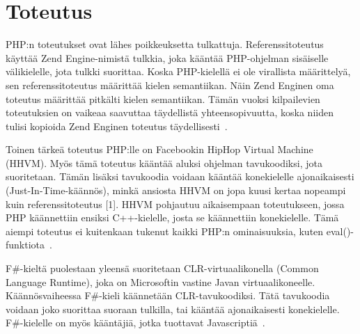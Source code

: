 \section{Toteutus}
PHP:n toteutukset ovat lähes poikkeuksetta tulkattuja. Referenssitoteutus  käyttää Zend Engine-nimistä tulkkia, joka kääntää PHP-ohjelman sisäiselle välikielelle, jota tulkki suorittaa. Koska PHP-kielellä ei ole virallista määrittelyä, sen referenssitoteutus määrittää kielen semantiikan. Näin Zend Enginen oma toteutus määrittää pitkälti kielen semantiikan. Tämän vuoksi kilpailevien toteutuksien on vaikeaa saavuttaa täydellistä yhteensopivuutta, koska niiden tulisi kopioida Zend Enginen toteutus täydellisesti~\cite{wiki_php}.

Toinen tärkeä toteutus PHP:lle on Facebookin HipHop Virtual Machine (HHVM).  Myös tämä toteutus kääntää aluksi ohjelman tavukoodiksi, jota suoritetaan. Tämän lisäksi tavukoodia voidaan kääntää konekielelle ajonaikaisesti (Just-In-Time-käännös), minkä ansiosta HHVM on jopa kuusi kertaa nopeampi kuin referenssitoteutus [1]. HHVM pohjautuu aikaisempaan toteutukseen, jossa PHP käännettiin ensiksi C++-kielelle, josta se käännettiin konekielelle. Tämä aiempi toteutus ei kuitenkaan tukenut kaikki PHP:n ominaisuuksia, kuten eval()-funktiota~\cite{wiki_hiphop}.

F\#-kieltä puolestaan yleensä suoritetaan CLR-virtuaalikonella (Common Language Runtime), joka on Microsoftin vastine Javan virtuaalikoneelle. Käännösvaiheessa F\#-kieli käännetään CLR-tavukoodiksi. Tätä tavukoodia voidaan joko suorittaa suoraan tulkilla, tai kääntää ajonaikaisesti konekielelle. F\#-kielelle on myös kääntäjiä, jotka tuottavat Javascriptiä~\cite{wikib_fs_programming}.